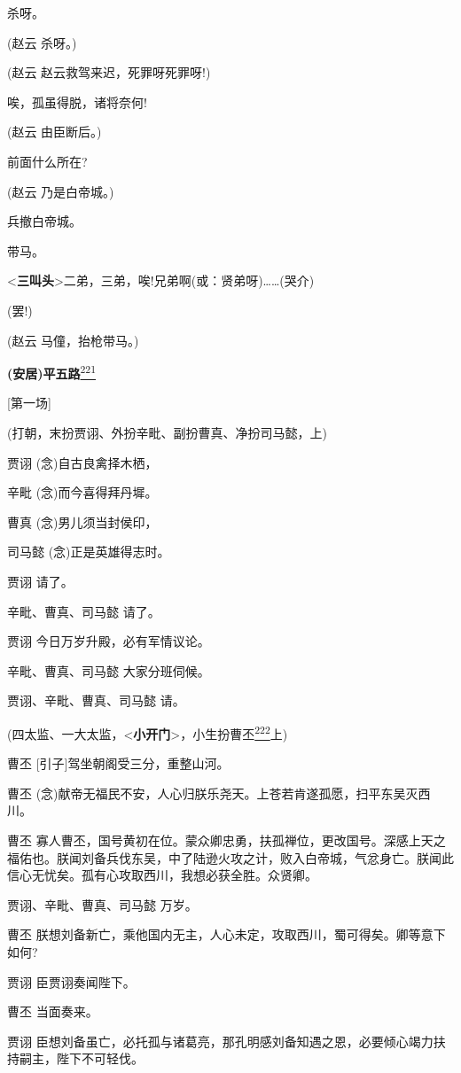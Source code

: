 杀呀。

(赵云 杀呀。)

(赵云 赵云救驾来迟，死罪呀死罪呀!)

唉，孤虽得脱，诸将奈何!

(赵云 由臣断后。)

前面什么所在?

(赵云 乃是白帝城。)

兵撤白帝城。

带马。

\textless{}\textbf{三叫头}\textgreater{}二弟，三弟，唉!兄弟啊(或：贤弟呀)\ldots{}\ldots{}(哭介)

(罢!)

(赵云 马僮，抬枪带马。)

\textbf{(安居)平五路}\protect\hyperlink{fn221}{\textsuperscript{221}}

{[}第一场{]}

(打朝，末扮贾诩、外扮辛毗、副扮曹真、净扮司马懿，上)

贾诩 (念)自古良禽择木栖，

辛毗 (念)而今喜得拜丹墀。

曹真 (念)男儿须当封侯印，

司马懿 (念)正是英雄得志时。

贾诩 请了。

辛毗、曹真、司马懿 请了。

贾诩 今日万岁升殿，必有军情议论。

辛毗、曹真、司马懿 大家分班伺候。

贾诩、辛毗、曹真、司马懿 请。

(四太监、一大太监，\textless{}\textbf{小开门}\textgreater{}，小生扮曹丕\protect\hyperlink{fn222}{\textsuperscript{222}}上)

曹丕 {[}引子{]}驾坐朝阁受三分，重整山河。

曹丕
(念)献帝无福民不安，人心归朕乐尧天。上苍若肯遂孤愿，扫平东吴灭西川。

曹丕
寡人曹丕，国号黄初在位。蒙众卿忠勇，扶孤禅位，更改国号。深感上天之福佑也。朕闻刘备兵伐东吴，中了陆逊火攻之计，败入白帝城，气忿身亡。朕闻此信心无忧矣。孤有心攻取西川，我想必获全胜。众贤卿。

贾诩、辛毗、曹真、司马懿 万岁。

曹丕
朕想刘备新亡，乘他国内无主，人心未定，攻取西川，蜀可得矣。卿等意下如何?

贾诩 臣贾诩奏闻陛下。

曹丕 当面奏来。

贾诩
臣想刘备虽亡，必托孤与诸葛亮，那孔明感刘备知遇之恩，必要倾心竭力扶持嗣主，陛下不可轻伐。

